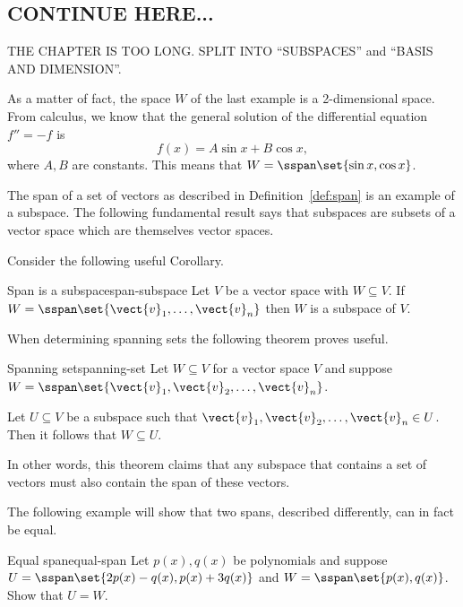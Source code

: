 \subsection{CONTINUE HERE...}


THE CHAPTER IS TOO LONG. SPLIT INTO ``SUBSPACES'' and ``BASIS AND DIMENSION''.


As a matter of fact, the space $W$ of the last example is a
2-dimensional space. From calculus, we know that the general solution
of the differential equation $f''=-f$ is
\begin{equation*}
  f(x) = A\sin x + B\cos x,
\end{equation*}
where $A,B$ are constants. This means that $W=\sspan\set{\sin x, \cos x}$.


The span of a set of vectors as described in Definition~\ref{def:span}
is an example of a subspace. The following fundamental result says
that subspaces are subsets of a vector space which are themselves
vector spaces.

Consider the following useful Corollary.

\begin{corollary}{Span is a subspace}{span-subspace}
  Let $V$ be a vector space with $W \subseteq V$. If
  $W = \sspan \set{\vect{v}_1,\ldots, \vect{v}_n }$ then $W$ is a
  subspace of $V$.
\end{corollary}

When determining spanning sets the following theorem proves useful.

\begin{theorem}{Spanning set}{spanning-set}
  Let $W \subseteq V$ for a vector space $V$ and suppose
  $W = \sspan \set{\vect{v}_1, \vect{v}_2,\ldots, \vect{v}_n }$.

  Let $U \subseteq V$ be a subspace such that
  $\vect{v}_1, \vect{v}_2,\ldots, \vect{v}_n \in U$. Then it follows
  that $W \subseteq U$.
\end{theorem}

In other words, this theorem claims that any subspace that contains a
set of vectors must also contain the span of these vectors.

The following example will show that two spans, described differently,
can in fact be equal.

\begin{example}{Equal span}{equal-span}
  Let $p(x), q(x)$ be polynomials and suppose
  $U = \sspan\set{2p(x) - q(x), p(x) + 3q(x)} $ and
  $W = \sspan\set{p(x), q(x) }$. Show that $U = W$.
\end{example}

